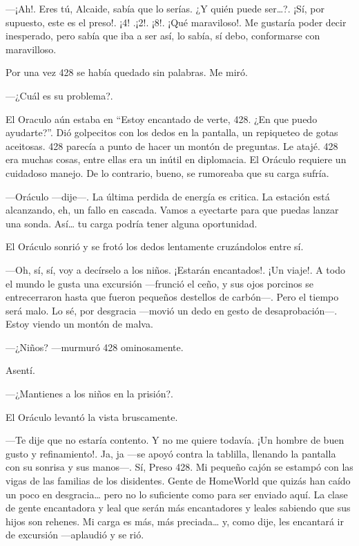 ---¡Ah!. Eres tú, Alcaide, sabía que lo serías. ¿Y quién puede
ser\ldots{}?. ¡Sí, por supuesto, este es el preso!. ¡4! .¡2!. ¡8!. ¡Qué
maraviloso!. Me gustaría poder decir inesperado, pero sabía que iba a
ser así, lo sabía, sí debo, conformarse con maravilloso.

Por una vez 428 se había quedado sin palabras. Me miró.

---¿Cuál es su problema?.

El Oraculo aún estaba en ``Estoy encantado de verte, 428. ¿En que puedo
ayudarte?''. Dió golpecitos con los dedos en la pantalla, un repiqueteo
de gotas aceitosas. 428 parecía a punto de hacer un montón de preguntas.
Le atajé. 428 era muchas cosas, entre ellas era un inútil en diplomacia.
El Oráculo requiere un cuidadoso manejo. De lo contrario, bueno, se
rumoreaba que su carga sufría.

---Oráculo ---dije---. La última perdida de energía es critica. La
estación está alcanzando, eh, un fallo en cascada. Vamos a eyectarte
para que puedas lanzar una sonda. Así\ldots{} tu carga podría tener
alguna oportunidad.

El Oráculo sonrió y se frotó los dedos lentamente cruzándolos entre sí.

---Oh, sí, sí, voy a decírselo a los niños. ¡Estarán encantados!. ¡Un
viaje!. A todo el mundo le gusta una excursión ---frunció el ceño, y sus
ojos porcinos se entrecerraron hasta que fueron pequeños destellos de
carbón---. Pero el tiempo será malo. Lo sé, por desgracia ---movió un
dedo en gesto de desaprobación---. Estoy viendo un montón de malva.

---¿Niños? ---murmuró 428 ominosamente.

Asentí.

---¿Mantienes a los niños en la prisión?.

El Oráculo levantó la vista bruscamente.

---Te dije que no estaría contento. Y no me quiere todavía. ¡Un hombre
de buen gusto y refinamiento!. Ja, ja ---se apoyó contra la tablilla,
llenando la pantalla con su sonrisa y sus manos---. Sí, Preso 428. Mi
pequeño cajón se estampó con las vigas de las familias de los
disidentes. Gente de HomeWorld que quizás han caído un poco en
desgracia\ldots{} pero no lo suficiente como para ser enviado aquí. La
clase de gente encantadora y leal que serán más encantadores y leales
sabiendo que sus hijos son rehenes. Mi carga es más, más
preciada\ldots{} y, como dije, les encantará ir de excursión ---aplaudió
y se rió.

